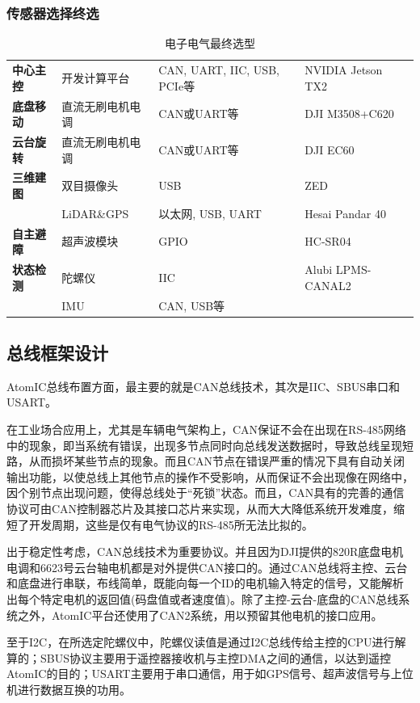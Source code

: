\subsubsection{传感器选择终选}

\begin{table}[H]
	\centering%
	\caption[centering]{电子电气最终选型}%
	\label{dzdqzu}%
	\begin{tabular}{C{2cm}C{3cm}C{5cm}C{3cm}}	
		\toprule
		 & & &\\ 
		\midrule
		
		\textbf{中心主控} & 开发计算平台 & CAN, UART, IIC, USB, PCIe等 & NVIDIA Jetson TX2\\
		\textbf{底盘移动} & 直流无刷电机电调 & CAN或UART等 & DJI M3508+C620 \\
		\textbf{云台旋转} & 直流无刷电机电调 & CAN或UART等 & DJI EC60 \\
		\textbf{三维建图} & 双目摄像头 & USB & ZED \\
		& LiDAR\&GPS & 以太网, USB, UART & Hesai Pandar 40 \\
		\textbf{自主避障} & 超声波模块 & GPIO & HC-SR04 \\
		\textbf{状态检测} & 陀螺仪 & IIC & Alubi LPMS-CANAL2 \\
		& IMU & CAN, USB等\\
		\bottomrule
	\end{tabular}
\end{table}

\subsection{总线框架设计}

AtomIC总线布置方面，最主要的就是CAN总线技术，其次是IIC、SBUS串口和USART。

在工业场合应用上，尤其是车辆电气架构上，CAN保证不会在出现在RS-485网络中的现象，即当系统有错误，出现多节点同时向总线发送数据时，导致总线呈现短路，从而损坏某些节点的现象。而且CAN节点在错误严重的情况下具有自动关闭输出功能，以使总线上其他节点的操作不受影响，从而保证不会出现像在网络中，因个别节点出现问题，使得总线处于“死锁”状态。而且，CAN具有的完善的通信协议可由CAN控制器芯片及其接口芯片来实现，从而大大降低系统开发难度，缩短了开发周期，这些是仅有电气协议的RS-485所无法比拟的。

出于稳定性考虑，CAN总线技术为重要协议。并且因为DJI提供的820R底盘电机电调和6623号云台轴电机都是对外提供CAN接口的。通过CAN总线将主控、云台和底盘进行串联，布线简单，既能向每一个ID的电机输入特定的信号，又能解析出每个特定电机的返回值(码盘值或者速度值)。除了主控-云台-底盘的CAN总线系统之外，AtomIC平台还使用了CAN2系统，用以预留其他电机的接口应用。

至于I2C，在所选定陀螺仪中，陀螺仪读值是通过I2C总线传给主控的CPU进行解算的；SBUS协议主要用于遥控器接收机与主控DMA之间的通信，以达到遥控AtomIC的目的；USART主要用于串口通信，用于如GPS信号、超声波信号与上位机进行数据互换的功用。